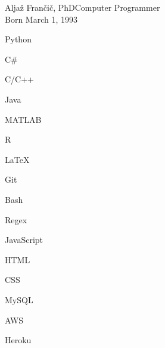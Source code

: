 \documentclass{article}
\begin{document}
\begin{cv}[avatar]{Aljaž Frančič, PhD}{Computer Programmer\\\small{Born March 1, 1993}}

\begin{cvitem}
    Python
\end{cvitem}
    
\begin{cvitem}
    C\#
\end{cvitem}
    
\begin{cvitem}
    C/C++
\end{cvitem}

\begin{cvitem}
    Java
\end{cvitem}

\begin{cvitem}
    MATLAB
\end{cvitem}

\begin{cvitem}
    R
\end{cvitem}

\begin{cvitem}
    LaTeX
\end{cvitem}

\begin{cvitem}
    Git
\end{cvitem}

\begin{cvitem}
    Bash
\end{cvitem}

\begin{cvitem}
    Regex
\end{cvitem}

\begin{cvitem}
    JavaScript
\end{cvitem}

\begin{cvitem}
    HTML
\end{cvitem}

\begin{cvitem}
    CSS
\end{cvitem}

\begin{cvitem}
    MySQL
\end{cvitem}

\begin{cvitem}
    AWS
\end{cvitem}

\begin{cvitem}
    Heroku
\end{cvitem}


\end{cv}
\end{document}

